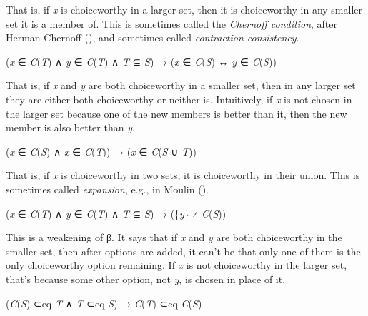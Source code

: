 \documentclass[
  11pt,
  letterpaper,
  DIV=11,
  numbers=noendperiod,
  twoside]{scrartcl}
\providecommand{\tightlist}{%
  \setlength{\itemsep}{0pt}\setlength{\parskip}{0pt}}
\begin{document}
That is, if \emph{x} is choiceworthy in a larger set, then it is
choiceworthy in any smaller set it is a member of. This is sometimes
called the \emph{Chernoff condition}, after Herman Chernoff
(), and sometimes called
\emph{contraction consistency}.

\begin{description}
\tightlist
\item[Property β]
(\emph{x} ∈ \emph{C}(\emph{T}) ∧ \emph{y} ∈ \emph{C}(\emph{T}) ∧
\emph{T} ⊆ \emph{S}) → (\emph{x} ∈ \emph{C}(\emph{S}) ↔ \emph{y} ∈
\emph{C}(\emph{S}))
\end{description}

That is, if \emph{x} and \emph{y} are both choiceworthy in a smaller
set, then in any larger set they are either both choiceworthy or neither
is. Intuitively, if \emph{x} is not chosen in the larger set because one
of the new members is better than it, then the new member is also better
than \emph{y}.

\begin{description}
\tightlist
\item[Property γ]
(\emph{x} ∈ \emph{C}(\emph{S}) ∧ \emph{x} ∈ \emph{C}(\emph{T})) →
(\emph{x} ∈ \emph{C}(\emph{S} ∪ \emph{T}))
\end{description}

That is, if \emph{x} is choiceworthy in two sets, it is choiceworthy in
their union. This is sometimes called \emph{expansion}, e.g., in Moulin
().

\begin{description}
\tightlist
\item[Property δ]
(\emph{x} ∈ \emph{C}(\emph{T}) ∧ \emph{y} ∈ \emph{C}(\emph{T}) ∧
\emph{T} ⊆ \emph{S}) → (\{\emph{y}\} ≠ \emph{C}(\emph{S}))
\end{description}

This is a weakening of β. It says that if \emph{x} and \emph{y} are both
choiceworthy in the smaller set, then after options are added, it can't
be that only one of them is the only choiceworthy option remaining. If
\emph{x} is not choiceworthy in the larger set, that's because some
other option, not \emph{y}, is chosen in place of it.

\begin{description}
\tightlist
\item[Property Aiz]
(\emph{C}(\emph{S}) ⊂eq \emph{T} ∧ \emph{T} ⊂eq \emph{S}) →
\emph{C}(\emph{T}) ⊂eq \emph{C}(\emph{S})
\end{description}
\end{document}
